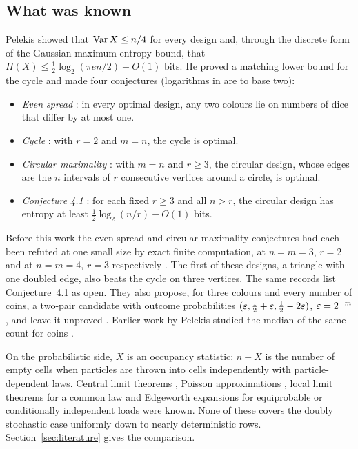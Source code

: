 \documentclass[11pt,a4paper]{article}
\theoremstyle{definition}\newtheorem{remark}[theorem]{Remark}\newtheorem{conjecture}{Conjecture}
\begin{document}
\subsection{What was known}
Pelekis \cite{pelekis} showed that $\operatorname{Var} X\le n/4$ for every design and, through the discrete form of the Gaussian maximum-entropy bound, that $H(X)\le\tfrac12\log_2(\pi e n/2)+O(1)$ bits. He proved a matching lower bound for the cycle and made four conjectures (logarithms in \cite{pelekis} are to base two):
\begin{itemize}
\item \emph{Even spread} \cite[Conjecture~1.3]{pelekis}: in every optimal design, any two colours lie on numbers of dice that differ by at most one.
\item \emph{Cycle} \cite[p.~123]{pelekis}: with $r=2$ and $m=n$, the cycle is optimal.
\item \emph{Circular maximality} \cite[p.~129]{pelekis}: with $m=n$ and $r\ge3$, the circular design, whose edges are the $n$ intervals of $r$ consecutive vertices around a circle, is optimal.
\item \emph{Conjecture 4.1} \cite[p.~129]{pelekis}: for each fixed $r\ge3$ and all $n>r$, the circular design has entropy at least $\tfrac12\log_2(n/r)-O(1)$ bits.
\end{itemize}
Before this work the even-spread and circular-maximality conjectures had each been refuted at one small size by exact finite computation, at $n=m=3$, $r=2$ and at $n=m=4$, $r=3$ respectively \cite{tt}. The first of these designs, a triangle with one doubled edge, also beats the cycle on three vertices. The same records list Conjecture~4.1 as open. They also propose, for three colours and every number of coins, a two-pair candidate with outcome probabilities $(\varepsilon,\tfrac12+\varepsilon,\tfrac12-2\varepsilon)$, $\varepsilon=2^{-m}$, and leave it unproved \cite{tt}. Earlier work by Pelekis studied the median of the same count for coins \cite{pelekis16}.

On the probabilistic side, $X$ is an occupancy statistic: $n-X$ is the number of empty cells when particles are thrown into cells independently with particle-dependent laws. Central limit theorems \cite{dm}, Poisson approximations \cite{mik}, local limit theorems for a common law \cite{hj} and Edgeworth expansions for equiprobable or conditionally independent loads \cite{mm,mjm,ke} were known. None of these covers the doubly stochastic case uniformly down to nearly deterministic rows. Section~\ref{sec:literature} gives the comparison.
\end{document}
